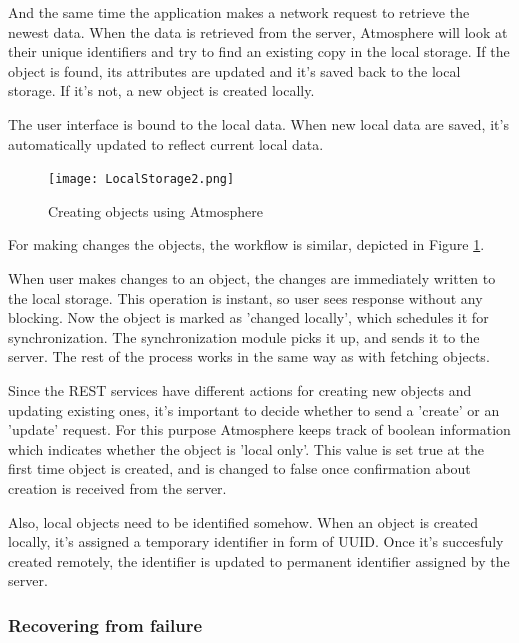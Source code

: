 And the same time the application makes a network request to retrieve the newest data.  When the data is retrieved from the server,  Atmosphere will look at their unique identifiers and try to find an existing copy in the local storage. If the object is found, its attributes are updated and it’s saved back to the local storage. If it’s not, a new object is created locally. 

The user interface is bound to the local data. When new local data are saved, it's automatically updated to reflect current local data. 

\begin{figure}[ht!]
\centering
\texttt{[image: LocalStorage2.png]}
\caption{Creating objects using Atmosphere \label{fig:2}}
\end{figure}

For making changes the objects, the workflow is similar, depicted in Figure \ref{fig:2}.

When user makes changes to an object,  the changes are immediately written to the local storage.  This operation is instant, so user sees response without any blocking. Now the object is marked as 'changed locally', which schedules it for synchronization. The synchronization module picks it up, and sends it to the server.  The rest of the process works in the same way as with fetching objects.

Since the REST services have different actions for creating new objects and updating existing ones, it's important to decide whether to send a 'create' or an 'update' request. For this purpose Atmosphere keeps track of boolean information which indicates whether the object is 'local only'. This value is set true at the first time object is created, and is changed to false once confirmation about creation is received from the server.

Also, local objects need to be identified somehow. When an object is created locally, it's assigned a temporary identifier in form of UUID. Once it's succesfuly created remotely, the identifier is updated to permanent identifier assigned by the server.

\subsubsection{Recovering from failure}
\label{sec:failure_recovery}

